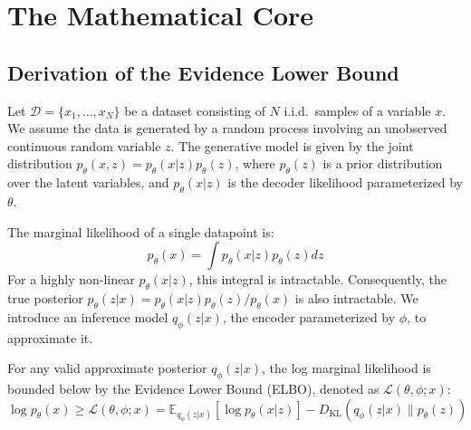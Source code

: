 \section{The Mathematical Core}

\subsection{Derivation of the Evidence Lower Bound}
Let $\mathcal{D} = \{x_1, \dots, x_N\}$ be a dataset consisting of $N$ i.i.d.\ samples of a variable $x$. We assume the data is generated by a random process involving an unobserved continuous random variable $z$. The generative model is given by the joint distribution $p_\theta(x, z) = p_\theta(x|z) p_\theta(z)$, where $p_\theta(z)$ is a prior distribution over the latent variables, and $p_\theta(x|z)$ is the decoder likelihood parameterized by $\theta$.

The marginal likelihood of a single datapoint is:
\begin{equation}
    p_\theta(x) = \int p_\theta(x|z) p_\theta(z) dz
\end{equation}
For a highly non-linear $p_\theta(x|z)$, this integral is intractable. Consequently, the true posterior $p_\theta(z|x) = p_\theta(x|z)p_\theta(z) / p_\theta(x)$ is also intractable. We introduce an inference model $q_\phi(z|x)$, the encoder parameterized by $\phi$, to approximate it.

\begin{theorem}
\label{thm:elbo}
For any valid approximate posterior $q_\phi(z|x)$, the log marginal likelihood is bounded below by the Evidence Lower Bound (ELBO), denoted as $\mathcal{L}(\theta, \phi; x)$:
\begin{equation}
    \log p_\theta(x) \ge \mathcal{L}(\theta, \phi; x) = \mathbb{E}_{q_\phi(z|x)}[\log p_\theta(x|z)] - D_{\text{KL}}(q_\phi(z|x) \parallel p_\theta(z))
\end{equation}
\end{theorem}

